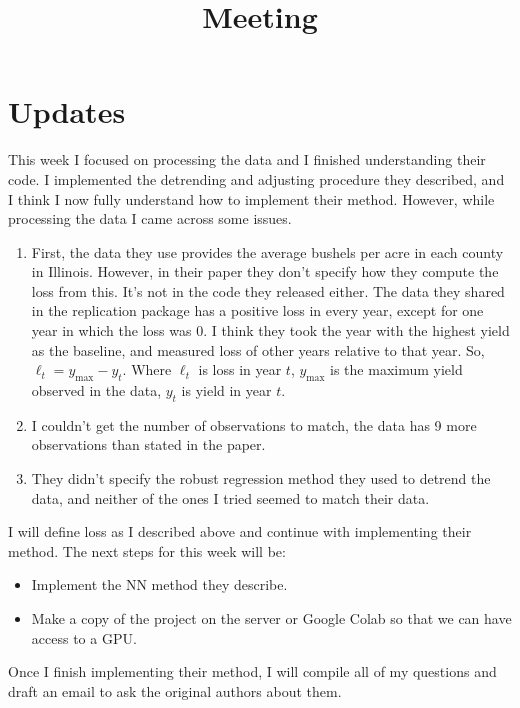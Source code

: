 \documentclass[11pt]{article}
\title{Meeting}
\begin{document}
\maketitle

\section{Updates}
This week I focused on processing the data and I finished understanding their code. I implemented the detrending and adjusting procedure they described, and I think I now fully understand how to implement their method. However, while processing the data I came across some issues.

\begin{enumerate}
    \item First, the data they use provides the average bushels per acre in each county in Illinois. However, in their paper they don't specify how they compute the loss from this. It's not in the code they released either. The data they shared in the replication package has a positive loss in every year, except for one year in which the loss was 0. I think they took the year with the highest yield as the baseline, and measured loss of other years relative to that year. So, $\ell_t = y_{\text{max}}-y_t$. Where $\ell_t$ is loss in year $t$, $y_{\text{max}}$ is the maximum yield observed in the data, $y_t$ is yield in year $t$.
    \item I couldn't get the number of observations to match, the data has 9 more observations than stated in the paper.
    \item They didn't specify the robust regression method they used to detrend the data, and neither of the ones I tried seemed to match their data.  
\end{enumerate}

I will define loss as I described above and continue with implementing their method. The next steps for this week will be: 

\begin{itemize}
    \item Implement the NN method they describe. 
    \item Make a copy of the project on the server or Google Colab so that we can have access to a GPU.
\end{itemize}

Once I finish implementing their method, I will compile all of my questions and draft an email to ask the original authors about them. 
\end{document}
